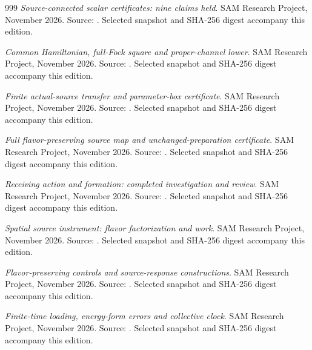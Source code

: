 \begin{thebibliography}{999}
\emph{Source-connected scalar certificates: nine claims held}. SAM Research Project, November 2026.
Source: . Selected snapshot and SHA-256 digest accompany this edition.

\emph{Common Hamiltonian, full-Fock square and proper-channel lower}. SAM Research Project, November 2026.
Source: . Selected snapshot and SHA-256 digest accompany this edition.

\emph{Finite actual-source transfer and parameter-box certificate}. SAM Research Project, November 2026.
Source: . Selected snapshot and SHA-256 digest accompany this edition.

\emph{Full flavor-preserving source map and unchanged-preparation certificate}. SAM Research Project, November 2026.
Source: . Selected snapshot and SHA-256 digest accompany this edition.

\emph{Receiving action and formation: completed investigation and review}. SAM Research Project, November 2026.
Source: . Selected snapshot and SHA-256 digest accompany this edition.

\emph{Spatial source instrument: flavor factorization and work}. SAM Research Project, November 2026.
Source: . Selected snapshot and SHA-256 digest accompany this edition.

\emph{Flavor-preserving controls and source-response constructions}. SAM Research Project, November 2026.
Source: . Selected snapshot and SHA-256 digest accompany this edition.

\emph{Finite-time loading, energy-form errors and collective clock}. SAM Research Project, November 2026.
Source: . Selected snapshot and SHA-256 digest accompany this edition.


\end{thebibliography}
